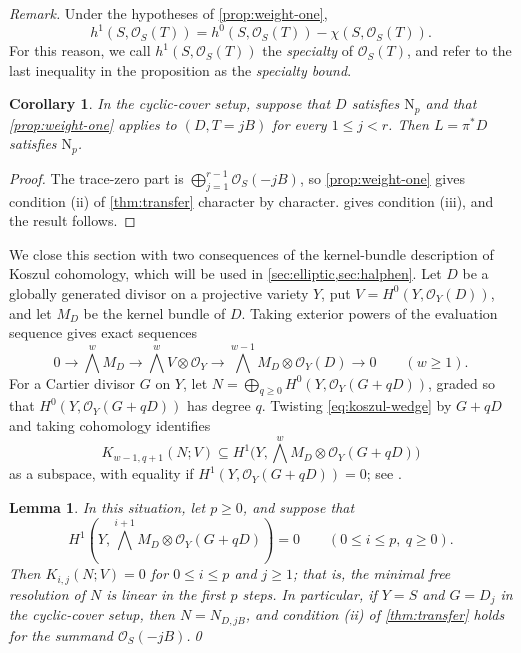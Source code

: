 \documentclass[11pt,reqno]{amsart}
\numberwithin{equation}{section}
\newtheorem{lemma}[lemma]{Lemma}
\newtheorem{corollary}[corollary]{Corollary}
\theoremstyle{remark}
\newcommand{\sshf}[1]{\mathcal{O}_{#1}}
\newcommand{\NP}{\mathrm N}
\begin{document}
\medskip\noindent\textit{Remark.}
Under the hypotheses of \cref{prop:weight-one}, 
\[
h^1(S,\sshf{S}(T))
=h^0(S,\sshf{S}(T))-\chi(S,\sshf{S}(T)).
\]
For this reason, we call $h^1(S,\sshf{S}(T))$ the \textit{specialty} of $\sshf{S}(T)$, and 
refer to the last inequality in the proposition as the
\emph{specialty bound}.

\begin{corollary}\label{cor:cyclic-reduction}
In the cyclic-cover setup,
suppose that \(D\) satisfies \(\NP_p\) and that
\cref{prop:weight-one} applies to \((D,T=jB)\) for every
\(1\leq j<r\). Then \(L=\pi^*D\) satisfies \(\NP_p\).
\end{corollary}

\begin{proof}
The trace-zero part is
\(\bigoplus_{j=1}^{r-1}\sshf{S}(-jB)\), so
\cref{prop:weight-one} gives condition (ii) of \cref{thm:transfer}
character by character.  gives condition (iii),
and the result follows.
\end{proof}

We close this section with two consequences of the kernel-bundle description of Koszul cohomology, which will be used in \cref{sec:elliptic,sec:halphen}. Let \(D\) be a globally generated divisor on a projective variety \(Y\), put \(V=H^0(Y,\sshf{Y}(D))\), and let \(M_D\) be the kernel bundle of \(D\). Taking exterior powers of the evaluation sequence gives exact sequences
\begin{equation}\label{eq:koszul-wedge}
 0\longrightarrow\bigwedge^{w}M_D\longrightarrow\bigwedge^{w}V\otimes\sshf{Y}
 \longrightarrow\bigwedge^{w-1}M_D\otimes\sshf{Y}(D)\longrightarrow0
 \qquad(w\geq1).
\end{equation}
For a Cartier divisor \(G\) on \(Y\), let \(N=\bigoplus_{q\geq0}H^0(Y,\sshf{Y}(G+qD))\), graded so that \(H^0(Y,\sshf{Y}(G+qD))\) has degree \(q\). Twisting \eqref{eq:koszul-wedge} by \(G+qD\) and taking cohomology identifies 
\[K_{w-1,q+1}(N;V)\subseteq H^1\bigl(Y,\bigwedge^wM_D\otimes\sshf{Y}(G+qD)\bigr)\]
as a subspace, with equality if \(H^1(Y,\sshf{Y}(G+qD))=0\); see \cite[Section~2.1]{AproduNagel}.

\begin{lemma}\label{lem:kernel-criterion}
In this situation, let \(p\geq0\), and suppose that
\begin{equation*}
H^1\!\left(Y,\bigwedge^{i+1}M_D\otimes\sshf{Y}(G+qD)\right)=0
 \qquad(0\leq i\leq p,\ q\geq0).
\end{equation*}
Then \(K_{i,j}(N;V)=0\) for \(0\leq i\leq p\) and \(j\geq1\); that is, the minimal free resolution of \(N\) is linear in the first \(p\) steps. In particular, if \(Y=S\) and \(G=D_j\) in the cyclic-cover setup, then \(N=N_{D,jB}\), and condition \textup{(ii)} of \cref{thm:transfer} holds for the summand \(\sshf{S}(-jB)\).\qed
\end{lemma}
\end{document}

